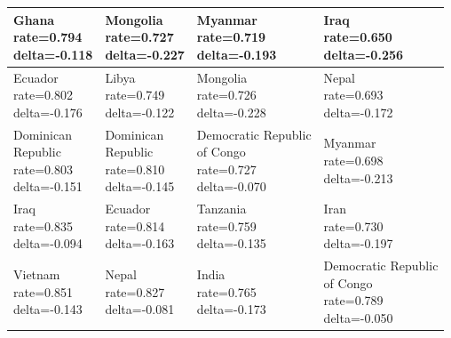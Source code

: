 \documentclass[runningheads]{llncs}
\begin{document}
{\begin{longtable}{p{}p{}p{}p{}}
\hline
\shortstack[l]{Ghana\\ rate=0.794\\ delta=-0.118} &\shortstack[l]{Mongolia\\ rate=0.727\\ delta=-0.227} &\shortstack[l]{Myanmar\\ rate=0.719\\ delta=-0.193} &\shortstack[l]{Iraq\\ rate=0.650\\ delta=-0.256} \\
\hline
\shortstack[l]{Ecuador\\ rate=0.802\\ delta=-0.176} &\shortstack[l]{Libya\\ rate=0.749\\ delta=-0.122} &\shortstack[l]{Mongolia\\ rate=0.726\\ delta=-0.228} &\shortstack[l]{Nepal\\ rate=0.693\\ delta=-0.172} \\
\hline
\shortstack[l]{Dominican\\ Republic\\ rate=0.803\\ delta=-0.151} &\shortstack[l]{Dominican\\ Republic\\ rate=0.810\\ delta=-0.145} &\shortstack[l]{Democratic Republic\\ of Congo\\ rate=0.727\\ delta=-0.070} &\shortstack[l]{Myanmar\\ rate=0.698\\ delta=-0.213} \\
\hline
\shortstack[l]{Iraq\\ rate=0.835\\ delta=-0.094} &\shortstack[l]{Ecuador\\ rate=0.814\\ delta=-0.163} &\shortstack[l]{Tanzania\\ rate=0.759\\ delta=-0.135} &\shortstack[l]{Iran\\ rate=0.730\\ delta=-0.197} \\
\hline
\shortstack[l]{Vietnam\\ rate=0.851\\ delta=-0.143} &\shortstack[l]{Nepal\\ rate=0.827\\ delta=-0.081} &\shortstack[l]{India\\ rate=0.765\\ delta=-0.173} &\shortstack[l]{Democratic Republic\\ of Congo\\ rate=0.789\\ delta=-0.050} \\

\end{longtable}}
\end{document}
